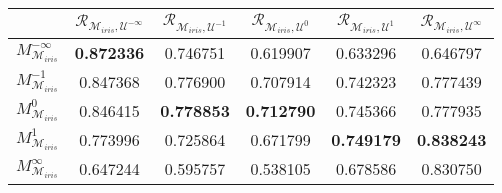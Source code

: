 \begin{tabular}{|l|c|c|c|c|c|}
\toprule
\hline
 & $\mathcal{R}_{\mathcal{M}_{iris}, \mathcal{U}^{-\infty}}$ & $\mathcal{R}_{\mathcal{M}_{iris}, \mathcal{U}^{-1}}$ & $\mathcal{R}_{\mathcal{M}_{iris}, \mathcal{U}^{0}}$ & $\mathcal{R}_{\mathcal{M}_{iris}, \mathcal{U}^{1}}$ & $\mathcal{R}_{\mathcal{M}_{iris}, \mathcal{U}^{\infty}}$ \\
\hline
\midrule
$M^{-\infty}_{\mathcal{M}_{iris}}$ & \textbf{0.872336} & 0.746751 & 0.619907 & 0.633296 & 0.646797 \\
$M^{-1}_{\mathcal{M}_{iris}}$ & 0.847368 & 0.776900 & 0.707914 & 0.742323 & 0.777439 \\
$M^{0}_{\mathcal{M}_{iris}}$ & 0.846415 & \textbf{0.778853} & \textbf{0.712790} & 0.745366 & 0.777935 \\
$M^{1}_{\mathcal{M}_{iris}}$ & 0.773996 & 0.725864 & 0.671799 & \textbf{0.749179} & \textbf{0.838243} \\
$M^{\infty}_{\mathcal{M}_{iris}}$ & 0.647244 & 0.595757 & 0.538105 & 0.678586 & 0.830750 \\
\hline
\bottomrule
\end{tabular}
